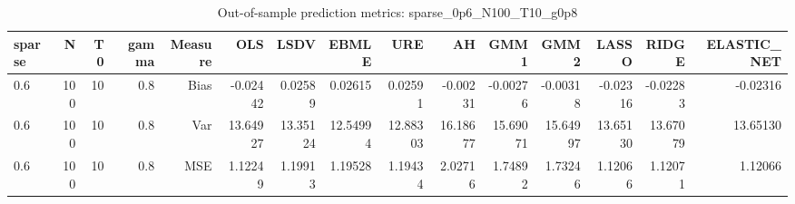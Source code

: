 \begin{table}[!htbp]\centering
\caption{Out-of-sample prediction metrics: sparse_0p6_N100_T10_g0p8}
\label{tab:table3_sparse_0p6_N100_T10_g0p8}
\begin{tabular}{lrrrrrrrrrrrrrr}
\hline
sparse & N & T0 & gamma & Measure & OLS & LSDV & EBMLE & URE & AH & GMM1 & GMM2 & LASSO & RIDGE & ELASTIC_NET \\
\hline
0.6 & 100 & 10 & 0.8 & Bias & -0.02442 & 0.02589 & 0.02615 & 0.02591 & -0.00231 & -0.00276 & -0.00318 & -0.02316 & -0.02283 & -0.02316 \\
0.6 & 100 & 10 & 0.8 & Var & 13.64927 & 13.35124 & 12.54994 & 12.88303 & 16.18677 & 15.69071 & 15.64997 & 13.65130 & 13.67079 & 13.65130 \\
0.6 & 100 & 10 & 0.8 & MSE & 1.12249 & 1.19913 & 1.19528 & 1.19434 & 2.02716 & 1.74892 & 1.73246 & 1.12066 & 1.12071 & 1.12066 \\
\hline
\end{tabular}
\end{table}

